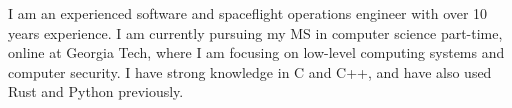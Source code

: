\documentclass[letter,10pt]{article}
\begin{document}
I am an experienced software and spaceflight operations engineer with over 10 years experience. I am currently pursuing my MS in computer science part-time, online at Georgia Tech, where I am focusing on low-level computing systems and computer security. I have strong knowledge in C and C++, and have also used Rust and Python previously.
\end{document}
